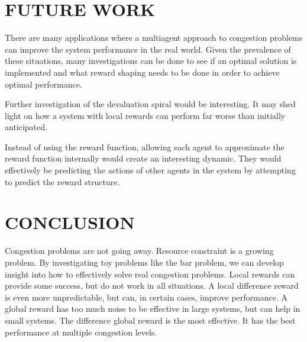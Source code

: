 \documentclass[letterpaper, 10 pt, conference]{ieeeconf}
\begin{document}
\section{FUTURE WORK}
\label{sec:futurework}
There are many applications where a multiagent approach to congestion problems can improve the system performance in the real world.  Given the prevalence of these situations, many investigations can be done to see if an optimal solution is implemented and what reward shaping needs to be done in order to achieve optimal performance.

Further investigation of the devaluation spiral would be interesting.  It may shed light on how a system with local rewards can perform far worse than initially anticipated.

Instead of using the reward function, allowing each agent to approximate the reward function internally would create an interesting dynamic.  They would effectively be predicting the actions of other agents in the system by attempting to predict the reward structure.

\section{CONCLUSION}
\label{sec:conclusion}
Congestion problems are not going away.  Resource constraint is a growing problem.  By investigating toy problems like the bar problem, we can develop insight into how to effectively solve real congestion problems.  Local rewards can provide some success, but do not work in all situations.  A local difference reward is even more unpredictable, but can, in certain cases, improve performance.  A global reward has too much noise to be effective in large systems, but can help in small systems.  The difference global reward is the most effective.  It has the best performance at multiple congestion levels.



%
%
\end{document}
